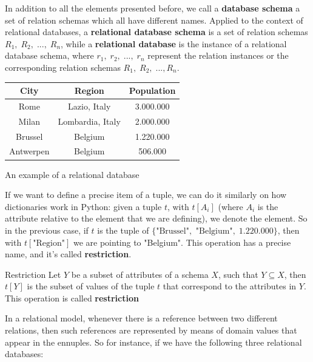 In addition to all the elements presented before, we call a \textbf{database schema} a set of relation schemas which all have different names. Applied to the context of relational databases, a \textbf{relational database schema} is a set of relation schemas $R_1, \; R_2, \; ..., \; R_n$, while a \textbf{relational database} is the instance of a relational database schema, where $r_1, \; r_2, \; ..., \; r_n$ represent the relation instances or the corresponding relation schemas $R_1, \; R_2, \; ..., R_n$.

\begin{center}
    \begin{tabular}{|c|c|c|}
        \hline \rowcolor{maindoccol!60}
        \textbf{City} & \textbf{Region} & \textbf{Population} \\
        \hline
        Rome & Lazio, Italy & 3.000.000 \\
        \hline
        Milan & Lombardia, Italy & 2.000.000 \\
        \hline
        Brussel & Belgium & 1.220.000 \\
        \hline
        Antwerpen & Belgium & 506.000 \\
        \hline
    \end{tabular}
    \nwl
    An example of a relational database
\end{center}

If we want to define a precise item of a tuple, we can do it similarly on how dictionaries work in Python: given a tuple $t$, with $t[A_i]$ (where $A_i$ is the attribute relative to the element that we are defining), we denote the element. So in the previous case, if $t$ is the tuple of $\{ \text{"Brussel"}, \text{ "Belgium"}, \; 1.220.000 \}$, then with $t[\text{"Region"}]$ we are pointing to "Belgium". This operation has a precise name, and it's called \textbf{restriction}.

\begin{definition}{Restriction}
    Let $Y$ be a subset of attributes of a schema $X$, such that $Y \subseteq X$, then $t[Y]$ is the subset of values of the tuple $t$ that correspond to the attributes in $Y$. This operation is called \textbf{restriction}
\end{definition}

In a relational model, whenever there is a reference between two different relations, then such references are represented by means of  domain values that appear in the ennuples. So for instance, if we have the following three relational databases:

